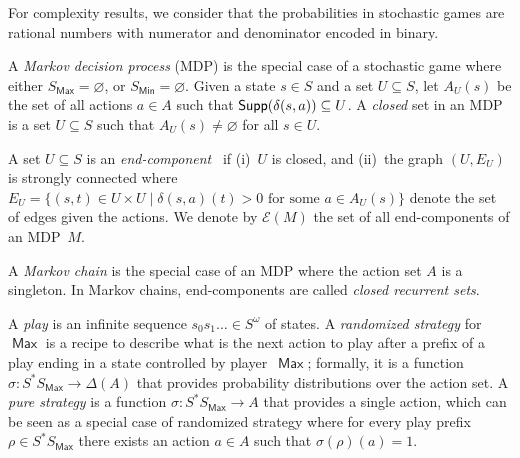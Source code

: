 \documentclass{article}
\let\emptyset\varnothing
\newcommand{\cale}{\mathcal E}
\newcommand{\Supp}{{\sf Supp}}
\newcommand{\DD}{\Delta}
\newcommand{\PP}{\delta}
\newcommand{\straa}{\sigma}
\DeclareMathOperator{\ma}{\mathsf{Max}}
\DeclareMathOperator{\mi}{\mathsf{Min}}
\begin{document}
For complexity results, we consider that the probabilities in stochastic games
are rational numbers with numerator and denominator 
encoded in binary.

\smallskip{}
A \emph{Markov decision process} (MDP) is the special case of a stochastic
game where either $S_{\ma} = \emptyset$, or $S_{\mi} = \emptyset$. 
Given a state $s \in S$ and a set $U \subseteq S$,
let $A_U(s)$ be the set of all actions $a \in A$ such 
that $\Supp(\PP(s,a)) \subseteq U$. 
A \emph{closed} set in an MDP is a set $U \subseteq S$ such 
that $A_U(s) \neq \emptyset$ for all $s \in U$. 
\begin{comment}
The transition function $\PP_U$ of the sub-MDP induced by a closed set $U$ is 
defined, for all $s \in U$ and $a \in A$, by $\PP_U(s,a) = \PP(s,a)$ if $a \in A_U(s)$, 
and $\PP_U(s,a) = \PP(s,b)$ for arbitrary $b \in A_U(s)$ otherwise.
The closed set $U$ is an \emph{end-component} if the underlying 
graph of the sub-MDP induced by $U$ is strongly connected~\cite{CY95}.
We denote by $\cale(M)$ the set of all end-components of an MDP~$M$.  
\end{comment}
A set $U \subseteq S$ is an {\em end-component}~\cite{CY95} if (i)~$U$ is closed, and 
(ii)~the graph $(U,E_U)$ is strongly connected
where $E_U=\{(s,t) \in U \times U \mid \PP(s,a)(t) > 0 \text{ for some } a \in A_U(s)\}$
denote the set of edges given the actions.
We denote by $\cale(M)$ the set of all end-components of an MDP~$M$.  

\smallskip{}
A \emph{Markov chain} is the special case of an MDP 
where the action set $A$ is a singleton. In Markov chains,
end-components are called \emph{closed recurrent sets}.







\smallskip{}
A \emph{play} is an infinite sequence $s_0 s_1 \ldots \in S^\omega$ of states.
A \emph{randomized strategy} for $\ma$ is a recipe to describe what is the next action to play
after a prefix of a play ending in a state controlled by player~$\ma$;
formally, it is a function $\straa:S^*S_{\ma} \to \DD(A)$ that provides
probability distributions over the action set. 
A \emph{pure strategy} is a function $\straa:S^*S_{\ma} \to A$ that provides
a single action, which can be seen as a special case of randomized strategy
where for every play prefix $\rho \in S^*S_{\ma}$ there exists an action $a \in A$ 
such that $\straa(\rho)(a) = 1$.
\end{document}
